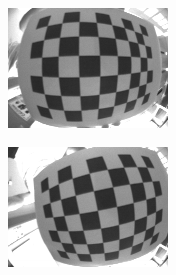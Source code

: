 \begin{figure}[h]
    \centering
    \begin{subfigure}[b]{0.2\textwidth}
        \centering
        \includegraphics[width=\textwidth]{images/camera/0.png}
    \end{subfigure}
    \begin{subfigure}[b]{0.2\textwidth}
        \centering
        \includegraphics[width=\textwidth]{images/camera/1.png}
    \end{subfigure}
    \begin{subfigure}[b]{0.2\textwidth}
        \centering

\end{subfigure}
\end{figure}
